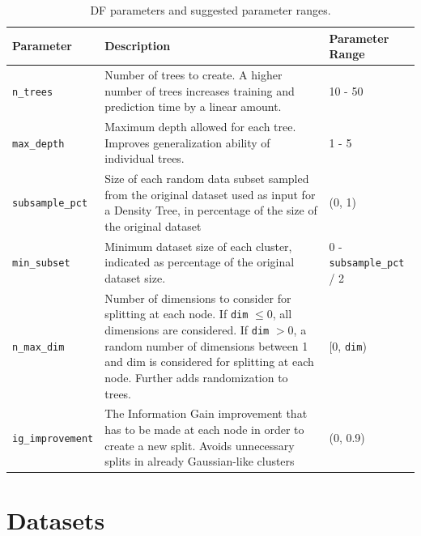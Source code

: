 \documentclass[10pt]{article}
\begin{document}
\begin{table}[H]
    \centering
    \begin{tabular}{p{3cm}p{9cm}p{2.5cm}}
    \toprule
    Parameter & Description & Parameter Range \\ \midrule
    \texttt{n\_trees} & Number of trees to create. A higher number of trees increases training and prediction time by a linear amount. & 10 - 50 \\
    \texttt{max\_depth} & Maximum depth allowed for each tree. Improves generalization ability of individual trees. & 1 - 5 \\
    \texttt{subsample\_pct} & Size of each random data subset sampled from the original dataset used as input for a Density Tree, in percentage of the size of the original dataset &  (0, 1) \\
    \texttt{min\_subset} & Minimum dataset size of each cluster, indicated as percentage of the original dataset size. & 0 - \texttt{subsample\_pct} / 2 \\
    \texttt{n\_max\_dim} & Number of dimensions to consider for splitting at each node. If \texttt{dim} $\leq 0$, all dimensions are considered. If \texttt{dim} $> 0$, a random number of dimensions between 1 and dim is considered for splitting at each node. Further adds randomization to trees. & ${[}$0, \texttt{dim}) \\
    \texttt{ig\_improvement} & The Information Gain improvement that has to be made at each node in order to create a new split. Avoids unnecessary splits in already Gaussian-like clusters & (0, 0.9) \\\bottomrule
    \end{tabular}
    \caption{\acrlong{DF} parameters and suggested parameter ranges.}
    \label{table:df-parameters}
\end{table}


\section{Datasets}
\end{document}
